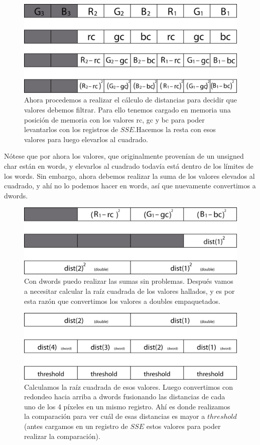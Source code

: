 	\begin{figure}[H]
		\includegraphics[scale=0.9]{imgs/fcolor_asm6.png}
		\caption{Ahora procedemos a realizar el c\'alculo de distancias para decidir que valores debemos filtrar. Para ello tenemos cargado en memoria una posici\'on de memoria con los valores rc, gc y bc para poder levantarlos con los registros de $SSE$.Hacemos la resta con esos valores para luego elevarlos al cuadrado. }
	\end{figure}
	
	N\'otese que por ahora los valores, que originalmente proven\'ian de un unsigned char est\'an en words, y elevarlos al cuadrado todav\'ia est\'a dentro de los l\'imites de los words. Sin embargo, ahora debemos realizar la suma de los valores elevados al cuadrado, y ah\'i no lo podemos hacer en words, as\'i que nuevamente convertimos a dwords.
	
	\begin{figure}[H]
		\includegraphics[scale=0.9]{imgs/fcolor_asm7.png}
		\caption{Con dwords puedo realizar las sumas sin problemas. Despu\'es vamos a necesitar calcular la ra\'iz cuadrada de los valores hallados, y es por esta raz\'on que convertimos los valores a doubles empaquetados.}
	\end{figure}
	
	\begin{figure}[H]
		\includegraphics[scale=0.9]{imgs/fcolor_asm8.png}
		\caption{Calculamos la ra\'iz cuadrada de esos valores. Luego convertimos con redondeo hacia arriba a dwords fusionando las distancias de cada uno de los 4 p\'ixeles en un mismo registro. Ah\'i es donde realizamos la comparaci\'on para ver cu\'al de esas distancias es mayor a $threshold$(antes cargamos en un registro de $SSE$ estos valores para poder realizar la comparaci\'on).}
	\end{figure}
	

